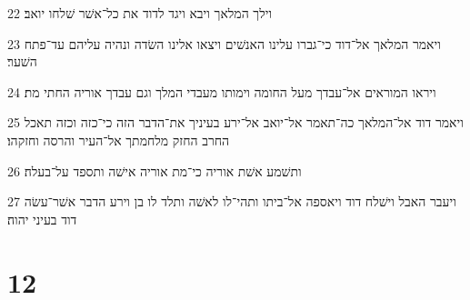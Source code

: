 \par 22 וילך המלאך ויבא ויגד לדוד את כל־אשׁר שׁלחו יואב׃
\par 23 ויאמר המלאך אל־דוד כי־גברו עלינו האנשׁים ויצאו אלינו השׂדה ונהיה עליהם עד־פתח השׁער׃
\par 24 ויראו המוראים אל־עבדך מעל החומה וימותו מעבדי המלך וגם עבדך אוריה החתי מת׃
\par 25 ויאמר דוד אל־המלאך כה־תאמר אל־יואב אל־ירע בעיניך את־הדבר הזה כי־כזה וכזה תאכל החרב החזק מלחמתך אל־העיר והרסה וחזקהו׃
\par 26 ותשׁמע אשׁת אוריה כי־מת אוריה אישׁה ותספד על־בעלה׃
\par 27 ויעבר האבל וישׁלח דוד ויאספה אל־ביתו ותהי־לו לאשׁה ותלד לו בן וירע הדבר אשׁר־עשׂה דוד בעיני יהוה׃

\chapter{12}

